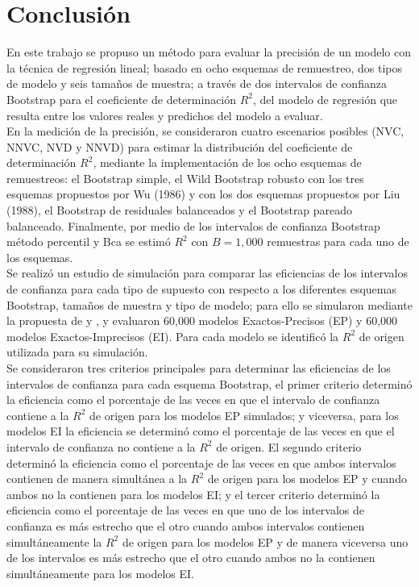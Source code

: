 \section{Conclusión}

En este trabajo se propuso un método para evaluar la precisión de un modelo con la técnica de regresión lineal; basado en ocho esquemas de remuestreo, dos tipos de modelo y seis tamaños de muestra; a través de dos intervalos de confianza Bootstrap para el coeficiente de determinación $R^2$, del modelo de regresión que resulta entre los valores reales y predichos del modelo a evaluar.\\

En la medición de la precisión, se consideraron cuatro escenarios posibles (NVC, NNVC, NVD y NNVD) para estimar la distribución del coeficiente de determinación $R^2$, mediante la implementación de los ocho esquemas de remuestreos: el Bootstrap simple, el Wild Bootstrap robusto con los tres esquemas propuestos por Wu (1986) y con los dos esquemas propuestos por Liu (1988), el Bootstrap de residuales balanceados y el Bootstrap pareado balanceado. Finalmente, por medio de los intervalos de confianza Bootstrap método percentil y Bca se estimó $R^2$ con $B=1,000$ remuestras para cada uno de los esquemas.\\

Se realizó un estudio de simulación para comparar las eficiencias de los intervalos de confianza para cada tipo de supuesto con respecto a los diferentes esquemas Bootstrap, tamaños de muestra y tipo de modelo; para ello se simularon mediante la propuesta de \textcite{febles-2014} y \textcite{zacarias-2023} , y evaluaron 60,000 modelos Exactos-Precisos (EP) y 60,000 modelos Exactos-Imprecisos (EI). Para cada modelo se identificó la $R^2$ de origen utilizada para su simulación.\\


Se consideraron tres criterios principales para determinar las eficiencias de los intervalos de confianza para cada esquema Bootstrap, el primer criterio determinó la eficiencia como el porcentaje de las veces en que el intervalo de confianza contiene a la $R^2$ de origen para los modelos EP simulados; y viceversa, para los modelos EI la eficiencia se determinó como el porcentaje de las veces en que el intervalo de confianza no contiene a la $R^2$ de origen. El segundo criterio determinó la eficiencia como el porcentaje de las veces en que ambos intervalos contienen de manera simultánea a la $R^2$ de origen para los modelos EP y cuando ambos no la contienen para los modelos EI; y el tercer criterio determinó la eficiencia como el porcentaje de las veces en que uno de los intervalos de confianza es más estrecho que el otro cuando ambos intervalos contienen simultáneamente la $R^2$ de origen para los modelos EP y de manera viceversa uno de los intervalos es más estrecho que el otro cuando ambos no la contienen simultáneamente para los modelos EI.\\


